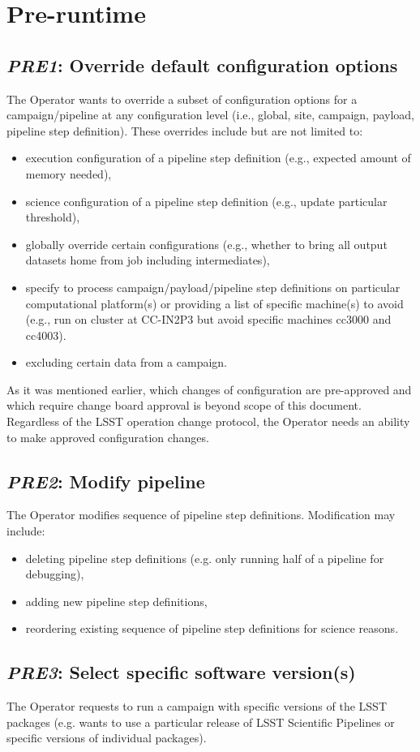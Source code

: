 \documentclass[DM,lsstdraft,toc]{lsstdoc}
\newcommand{\usecase}[2]{\subsection{\emph{#1}: #2}\label{use:#1}}
\begin{document}
\section{Pre-runtime}

\usecase{PRE1}{Override default configuration options}
The Operator wants to override a subset of configuration options for a
campaign/pipeline at any configuration level (i.e., global, site, campaign,
payload, pipeline step definition).  These overrides include but are not
limited to:
\begin{itemize}
  \item
    execution configuration of a pipeline step definition (e.g., expected
    amount of memory needed),
  \item
    science configuration of a pipeline step definition (e.g., update
    particular threshold),
  \item
    globally override certain configurations (e.g., whether to bring all output
    datasets home from job including intermediates),
  \item
    specify to process campaign/payload/pipeline step definitions on particular
    computational platform(s) or providing a list of specific machine(s) to
    avoid (e.g., run on cluster at CC-IN2P3 but avoid specific machines cc3000
    and cc4003).
  \item
    excluding certain data from a campaign.
\end{itemize}
As it was mentioned earlier, which changes of configuration are pre-approved
and which require change board approval is beyond scope of this document.
Regardless of the LSST operation change protocol, the Operator needs an ability 
to make approved configuration changes.


\usecase{PRE2}{Modify pipeline}
The Operator modifies sequence of pipeline step definitions. Modification may
include: 
\begin{itemize}
  \item
    deleting pipeline step definitions (e.g. only running half of a pipeline
    for debugging),
  \item
    adding new pipeline step definitions,
  \item
    reordering existing sequence of pipeline step definitions for science
    reasons.
\end{itemize}

\usecase{PRE3}{Select specific software version(s)}
The Operator requests to run a campaign with specific versions of the
LSST packages (e.g. wants to use a particular release of LSST Scientific
Pipelines or specific versions of individual packages).
\end{document}

